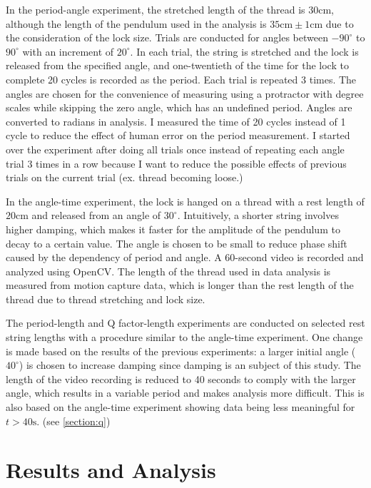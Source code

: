 \documentclass[12pt]{article}
\begin{document}
In the period-angle experiment, the stretched length of the thread is $30\mathrm{cm}$, although the length of the pendulum used in the analysis is $35\mathrm{cm}\pm1\mathrm{cm}$ due to the consideration of the lock size. Trials are conducted for angles between $-90^\circ$ to $90^\circ$ with an increment of $20^\circ$. In each trial, the string is stretched and the lock is released from the specified angle, and one-twentieth of the time for the lock to complete 20 cycles is recorded as the period. Each trial is repeated 3 times. The angles are chosen for the convenience of measuring using a protractor with degree scales while skipping the zero angle, which has an undefined period. Angles are converted to radians in analysis. I measured the time of 20 cycles instead of 1 cycle to reduce the effect of human error on the period measurement. I started over the experiment after doing all trials once instead of repeating each angle trial 3 times in a row because I want to reduce the possible effects of previous trials on the current trial (ex. thread becoming loose.)

In the angle-time experiment, the lock is hanged on a thread with a rest length of $20\mathrm{cm}$ and released from an angle of $30^\circ$. Intuitively, a shorter string involves higher damping, which makes it faster for the amplitude of the pendulum to decay to a certain value. The angle is chosen to be small to reduce phase shift caused by the dependency of period and angle. A 60-second video is recorded and analyzed using OpenCV. The length of the thread used in data analysis is measured from motion capture data, which is longer than the rest length of the thread due to thread stretching and lock size.

The period-length and Q factor-length experiments are conducted on selected rest string lengths with a procedure similar to the angle-time experiment. One change is made based on the results of the previous experiments: a larger initial angle ($40^\circ$) is chosen to increase damping since damping is an subject of this study. The length of the video recording is reduced to 40 seconds to comply with the larger angle, which results in a variable period and makes analysis more difficult. This is also based on the angle-time experiment showing data being less meaningful for $t>40\mathrm{s}$. (see {\ref{section:q}})


\section{Results and Analysis}
\end{document}
